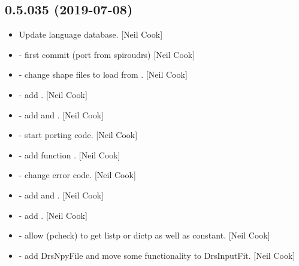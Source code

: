 \documentclass[a4paper,10pt,english]{report}
\begin{document}
\subsection{0.5.035 (2019-07-08)}
\label{\detokenize{misc/changelog:id105}}\begin{itemize}
\item {} 
Update language database. {[}Neil Cook{]}

\item {} 
 - first commit (port from spiroudrs) {[}Neil Cook{]}

\item {} 
 - change shape files to load from
. {[}Neil Cook{]}

\item {} 
 - add . {[}Neil Cook{]}

\item {} 
 - add  and .
{[}Neil Cook{]}

\item {} 
 - start porting code. {[}Neil
Cook{]}

\item {} 
 - add function . {[}Neil Cook{]}

\item {} 
 - change error code. {[}Neil Cook{]}

\item {} 
 - add  and . {[}Neil
Cook{]}

\item {} 
 - add . {[}Neil Cook{]}

\item {} 
 - allow  (pcheck) to get listp or dictp as well
as constant. {[}Neil Cook{]}

\item {} 
 - add DrsNpyFile and move some functionality to
DrsInputFit. {[}Neil Cook{]}


\end{itemize}
\end{document}
